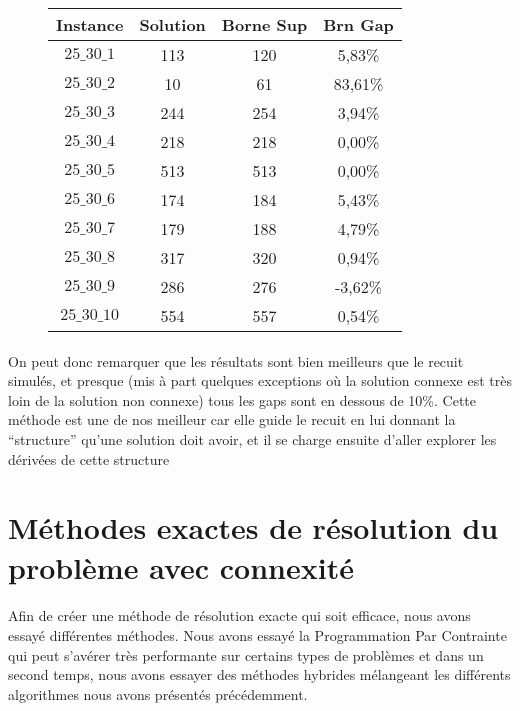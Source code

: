 \documentclass[a4paper, 11pt]{article} %
\begin{document}
\begin{center}
\begin{figure}[H]
      \begin{tabular}{|c|c|c|c|}
      \hline 
        Instance & Solution & Borne Sup & Brn Gap  \\ \hline
$25\_30\_1$ & 113 & 120 & 5,83\% \\ \hline
$25\_30\_2$ & 10 &  61 &  83,61\% \\ \hline
$25\_30\_3$ & 244 & 254 & 3,94\% \\ \hline
$25\_30\_4$ & 218 & 218 & 0,00\% \\ \hline
$25\_30\_5$ & 513 & 513 & 0,00\% \\ \hline
$25\_30\_6$ & 174 & 184 & 5,43\% \\ \hline
$25\_30\_7$ & 179 & 188 & 4,79\% \\ \hline
$25\_30\_8$ & 317 & 320 & 0,94\% \\ \hline
$25\_30\_9$ & 286 & 276 & -3,62\% \\ \hline
$25\_30\_10$ & 554 & 557 & 0,54\% \\ \hline
      \end{tabular}
\end{figure}
\end{center}

\paragraph*{}
On peut donc remarquer que les résultats sont bien meilleurs que le recuit simulés, et presque (mis à part quelques exceptions où la solution connexe est très loin de la solution non connexe) tous les gaps sont en dessous de 10\%. Cette méthode est une de nos meilleur car elle guide le recuit en lui donnant la ``structure'' qu'une solution doit avoir, et il se charge ensuite d'aller explorer les dérivées de cette structure

\section{Méthodes exactes de résolution du problème avec connexité}

\paragraph*{}
Afin de créer une méthode de résolution exacte qui soit efficace, nous avons essayé différentes méthodes. Nous avons essayé la Programmation Par Contrainte qui peut s'avérer très performante sur certains types de problèmes et dans un second temps, nous avons essayer des méthodes hybrides mélangeant les différents algorithmes nous avons présentés précédemment.
\end{document}
